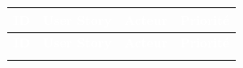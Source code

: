 \begin{center}
\small
\setlength{\tabcolsep}{6pt}
\renewcommand{\arraystretch}{1.3}

\begin{longtable}{|>{\centering\arraybackslash}p{0.8cm}|>{\RaggedRight\arraybackslash}p{8.5cm}|>{\centering\arraybackslash}p{2.8cm}|>{\centering\arraybackslash}p{1.6cm}|}
\hline
\rowcolor{headercolor}
\textcolor{white}{\textbf{ID}} & \textcolor{white}{\textbf{User Story}} & \textcolor{white}{\textbf{Acteur}} & \textcolor{white}{\textbf{Priorité}} \\
\hline
\endfirsthead

\hline
\rowcolor{headercolor}
\textcolor{white}{\textbf{ID}} & \textcolor{white}{\textbf{User Story}} & \textcolor{white}{\textbf{Acteur}} & \textcolor{white}{\textbf{Priorité}} \\
\hline
\endhead

\hline
\endlastfoot


\end{longtable}
\end{center}
